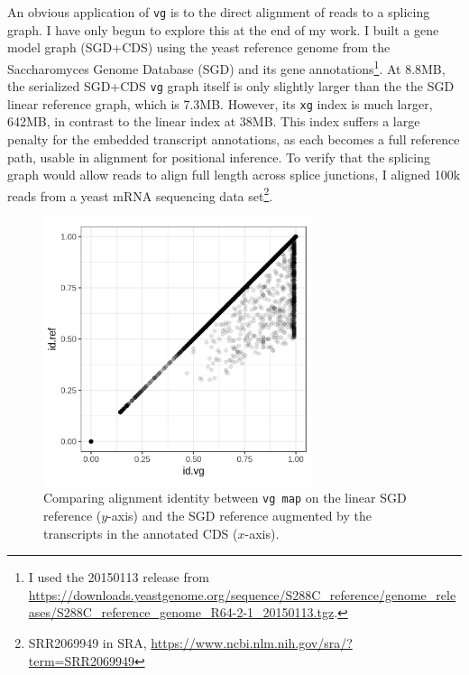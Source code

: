An obvious application of {\tt vg} is to the direct alignment of reads to a splicing graph.
I have only begun to explore this at the end of my work.
I built a gene model graph (SGD+CDS) using the yeast reference genome from the Saccharomyces Genome Database (SGD) and its gene annotations\footnote{I used the 20150113 release from \url{https://downloads.yeastgenome.org/sequence/S288C_reference/genome_releases/S288C_reference_genome_R64-2-1_20150113.tgz}.}.
At 8.8MB, the serialized SGD+CDS {\tt vg} graph itself is only slightly larger than the the SGD linear reference graph, which is 7.3MB.
However, its {\tt xg} index is much larger, 642MB, in contrast to the linear index at 38MB.
This index suffers a large penalty for the embedded transcript annotations, as each becomes a full reference path, usable in alignment for positional inference.
To verify that the splicing graph would allow reads to align full length across splice junctions, I aligned 100k reads from a yeast mRNA sequencing data set\footnote{SRR2069949 in SRA, \url{https://www.ncbi.nlm.nih.gov/sra/?term=SRR2069949}}.

\begin{figure}[htbp!]
  \centering
  \includegraphics[width=0.7\textwidth]{Chapter3/Figs/SRR2069949_100k_ref_vs_gene_model.png}
  \caption[Aligning reads against the yeast transcriptome]{
    Comparing alignment identity between {\tt vg map} on the linear SGD reference ($y$-axis) and the SGD reference augmented by the transcripts in the annotated CDS ($x$-axis).
  }
  \label{fig:yeast_rnaseq}
\end{figure}


